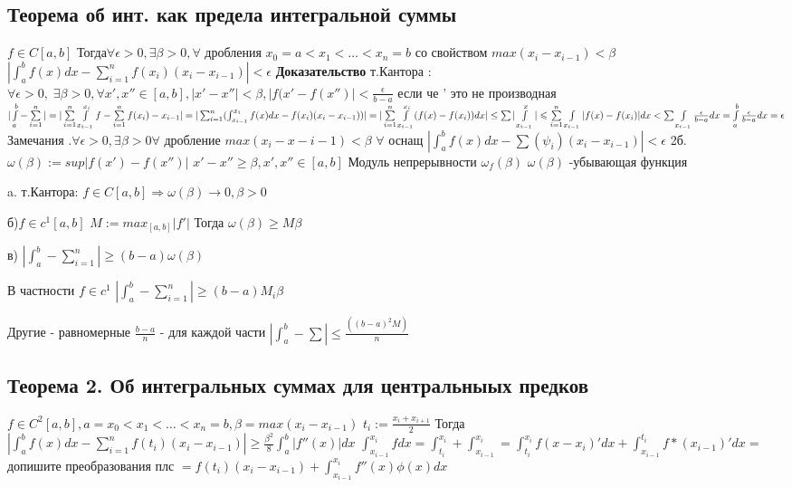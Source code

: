 \documentclass[12pt, a4paper]{article}
\newcommand{\nl}{\newline}
\begin{document}
\subsection{Теорема об инт. как предела интегральной суммы}
$ f \in C[a,b] $\nl
Тогда$\forall \epsilon > 0 , \exists \beta>0, \forall$ дробления $ x_0 = a< x_1 < \dots < x_n =b $ со свойством $max(x_i -x_{i-1})< \beta$ \nl
$| \int_a^b f(x) dx  - \sum_{i=1}^n f(x_i)(x_i -x_{i-1})|<\epsilon$ \nl
\textbf{Доказательство} \nl
т.Кантора : $  \forall \epsilon > 0, \; \exists \beta >0 , \forall x', x'' \in [a,b], | x' -x''| < \beta, |f(x' -f( x'')|<\frac{\epsilon}{b - a}$ если че '  это не производная \nl
$|\int \limits_a^b - \sum \limits_{i=1}^n | = | \sum \limits_{i=1}^n \int \limits_{x_{i-1}}^{x_i} f - \sum \limits_{i=1}^n f(x_i)-x_{i-1}| = |\sum_{i=1}^n(\int_{x_{i-1}}^{x_i} f(x)dx - f(x_i)(x_i - x_{i-1})) |  \nl
 = |\sum \limits_{i=1}^n \int \limits_{x_{i-1}}^{x_i} (f(x)-f(x_i))dx|\leq \sum |\int \limits_{x_{i-1}}^x| \leqslant   \sum \limits_{i=1}^n \int \limits_{x_{i-1}}|f(x)-f(x_i)|dx < \sum \int \limits_{x_{i-1}}\frac{\epsilon}{b-a}dx = \int \limits_a^b \frac{\epsilon}{b-a} dx = \epsilon$ \nl
Замечания \nl
1.$\forall \epsilon > 0, \exists \beta > 0 \forall$ дробление $max(x_i - x-{i-1})<\beta$\nl
$\forall$ оснащ \nl
$|\int_a^b f(x)dx - \sum(\psi_i)(x_i - x_{i-1}) | < \epsilon$ \nl
\nl
2б. $\omega(\beta) := sup |f(x') - f(x'')| $\nl
$x' -x'' \geqslant \beta, x',x'' \in [a, b]$ \nl
Модуль непрерывности $ \omega_f(\beta) $ \nl
		$ \omega(\beta)$ -убывающая функция \nl
		
a.  т.Кантора: \nl
		$ f \in C[a,b] \Rightarrow \omega(\beta) \longrightarrow 0, \beta >0 $ \nl
		
б)$f\in c^1[a,b] $ \nl 
		$ M:= max_{[a,b]} |f'| $ \nl
	Тогда $ \omega(\beta) \geq M\beta $ \nl

в) $|\int_a^b -\sum_{i=1}^n| \geq (b -a)\omega(\beta)$ \nl

В частности  $f\in c^1$ \nl
		$ |\int_a^b -\sum_{i=1}^n| \geq (b-a)M_i\beta $ \nl
		
Другие - равномерные $ \frac{b -a }{n} $ - для каждой части \nl
       $ |\int_a^b-\sum| \leq \frac{((b-a)^2M)}{n} $\nl
       
  \subsection{Теорема 2. Об интегральных суммах для центральныых предков}
  		 $ f \in C^2[a,b] , a = x_0 < x_1 < \dots < x_n = b ,  \beta = max(x_i - x_{i -1})$ \nl
  		 $t_{i} := \frac{x_{i}+x_{i+1}}{2} $ \nl 
 Тогда  $| \int_a^b f(x)dx- \sum_{i=1}^n f(t_i)(x_i - x_{i-1}) | \geq \frac{\beta^2}{8} \int_a^b |f''(x)|dx $ \nl
 		 $ \int_{x_{i-1}}^{x_i} f dx = \int_{t_i}^{x_i} + \int_{x_{i-1}}^{x_i} = \int_{t_i}^{x_i} f(x-x_i)' dx  + \int_{x_{i-1}}^{t_i} f*(x_{i-1})' dx =$ допишите преобразования плс $ =f(t_i)(x_i- x_{i-1}) + \int_{x_{i-1}}^{x_i}f''(x)\phi(x)dx $\nl
 		
\end{document}
